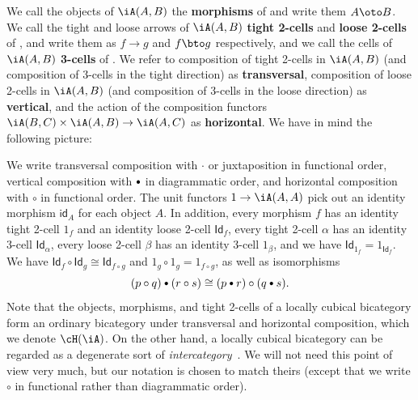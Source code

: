 \documentclass{amsart}
\let\tc\cdot
\newcommand{\bc}{\mathbin{\raisebox{1pt}{\scriptsize$\bullet$}}}
\let\oc\circ
\renewcommand{\id}{\mathsf{id}}
\newcommand{\Id}{\mathsf{Id}}
\begin{document}
We call the objects of $\iA(A,B)$ the \textbf{morphisms} of \iA and write them $A\oto B$.
We call the tight and loose arrows of $\iA(A,B)$ \textbf{tight 2-cells} and \textbf{loose 2-cells} of \iA, and write them as $f\to g$ and $f\bto g$ respectively, and we call the cells of $\iA(A,B)$ \textbf{3-cells} of \iA.
We refer to composition of tight 2-cells in $\iA(A,B)$ (and composition of 3-cells in the tight direction) as \textbf{transversal}, composition of loose 2-cells in $\iA(A,B)$ (and composition of 3-cells in the loose direction) as \textbf{vertical}, and the action of the composition functors $\iA(B,C)\times \iA(A,B) \to \iA(A,C)$ as \textbf{horizontal}.
We have in mind the following picture:
\begin{center}
\end{center}

We write transversal composition with $\tc$ or juxtaposition in functional order, vertical composition with $\bc $ in diagrammatic order, and horizontal composition with $\oc$ in functional order.
The unit functors $1\to\iA(A,A)$ pick out an identity morphism $\id_A$ for each object $A$.
In addition, every morphism $f$ has an identity tight 2-cell $1_f$ and an identity loose 2-cell $\Id_f$, every tight 2-cell $\alpha$ has an identity 3-cell $\Id_\alpha$, every loose 2-cell $\beta$ has an identity 3-cell $1_\beta$, and we have $\Id_{1_f} = 1_{\Id_f}$.
We have $\Id_f \oc \Id_{g} \cong \Id_{f\oc g}$ and $1_g \oc 1_g = 1_{f\oc g}$, as well as isomorphisms
\begin{equation}
  (p\oc q) \bc (r\oc s) \cong (p\bc r) \oc (q\bc s).\label{eq:interchange}
\end{equation}
Note that the objects, morphisms, and tight 2-cells of a locally cubical bicategory \iA form an ordinary bicategory under transversal and horizontal composition, which we denote $\cH(\iA)$.
On the other hand, a locally cubical bicategory can be regarded as a degenerate sort of \emph{intercategory}~\cite{gp:intercategories-i}.
We will not need this point of view very much, but our notation is chosen to match theirs (except that we write $\oc$ in functional rather than diagrammatic order).
\end{document}
